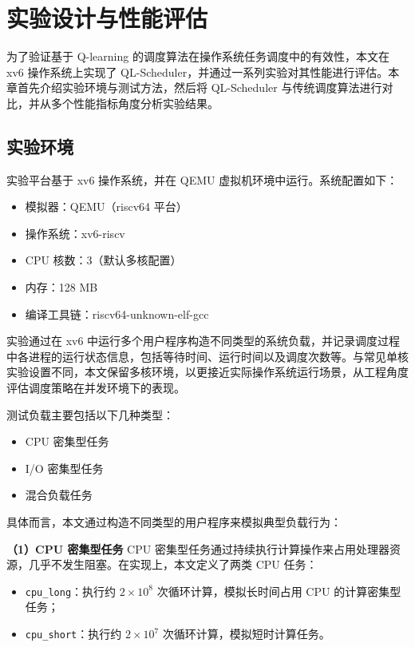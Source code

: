 \section{实验设计与性能评估}

为了验证基于 Q-learning 的调度算法在操作系统任务调度中的有效性，本文在 xv6 操作系统上实现了 QL-Scheduler，并通过一系列实验对其性能进行评估。本章首先介绍实验环境与测试方法，然后将 QL-Scheduler 与传统调度算法进行对比，并从多个性能指标角度分析实验结果。

\subsection{实验环境}

实验平台基于 xv6 操作系统，并在 QEMU 虚拟机环境中运行。系统配置如下：

\begin{itemize}
\item 模拟器：QEMU（riscv64 平台）
\item 操作系统：xv6-riscv
\item CPU 核数：3（默认多核配置）
\item 内存：128 MB
\item 编译工具链：riscv64-unknown-elf-gcc
\end{itemize}

实验通过在 xv6 中运行多个用户程序构造不同类型的系统负载，并记录调度过程中各进程的运行状态信息，包括等待时间、运行时间以及调度次数等。与常见单核实验设置不同，本文保留多核环境，以更接近实际操作系统运行场景，从工程角度评估调度策略在并发环境下的表现。

测试负载主要包括以下几种类型：

\begin{itemize}
\item CPU 密集型任务
\item I/O 密集型任务
\item 混合负载任务
\end{itemize}

具体而言，本文通过构造不同类型的用户程序来模拟典型负载行为：

\textbf{（1）CPU 密集型任务}  
CPU 密集型任务通过持续执行计算操作来占用处理器资源，几乎不发生阻塞。在实现上，本文定义了两类 CPU 任务：

\begin{itemize}
\item \texttt{cpu\_long}：执行约 $2\times10^8$ 次循环计算，模拟长时间占用 CPU 的计算密集型任务；
\item \texttt{cpu\_short}：执行约 $2\times10^7$ 次循环计算，模拟短时计算任务。
\end{itemize}

